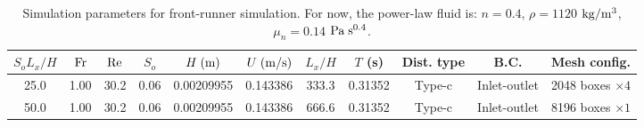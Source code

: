\documentclass[a4paper]{article}
\newcommand{\fr}{{\rm{Fr}}}
\begin{document}
\begin{table}[htbp]
	\centering
	\begin{tabular}{ccccccccccc}
		$S_oL_x/H$ & $\fr$ & $\rm Re$ & $S_o$ & $H\;{\rm (m)}$ & $U\;{\rm (m/s)}$ & $L_x/H$ & $T$ (s) & Dist. type & B.C.  & Mesh config.\\
		\toprule
		25.0 & 1.00 & 30.2 & 0.06 & 0.00209955 & 0.143386 & 333.3 & 0.31352 & Type-c & Inlet-outlet & 2048 boxes $\times 4$\\
		50.0 & 1.00 & 30.2 & 0.06 & 0.00209955 & 0.143386 & 666.6 & 0.31352 & Type-c & Inlet-outlet & 8196 boxes $\times 1$\\
		\bottomrule 
	\end{tabular}
	\caption{Simulation parameters for front-runner simulation. For now, the power-law fluid is: $n=0.4$, $\rho=1120$ $\rm{kg/m^3}$, $\mu_n=0.14$ $\rm Pa\;s^{0.4}$.}
	\label{simulation4}
\end{table}
\end{document}
